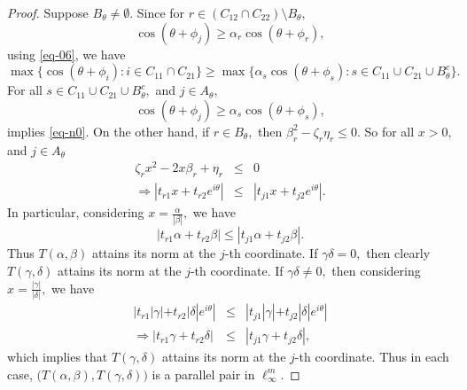 \documentclass{amsart}
\theoremstyle{definition}
\theoremstyle{remark}
\numberwithin{equation}{section}
\begin{document}
\begin{proof}
	 Suppose $B_\theta\neq \emptyset.$ Since for  $r\in (C_{12}\cap C_{22})\setminus B_\theta,$ 
	  $$\cos(\theta+\phi_j)\geq\alpha_r\cos(\theta+\phi_r),$$ using  \eqref{eq-06}, we have
	\[\max\{\cos(\theta+\phi_i):i\in C_{11}\cap C_{21}\}\geq \max\{\alpha_s\cos(\theta+\phi_s):s\in C_{11}\cup C_{21}\cup B_\theta^c\}.\] 
	For all $s\in C_{11}\cup C_{21}\cup B_\theta^c,$ and $j\in A_\theta,$  $$	\cos(\theta+\phi_j)\geq \alpha_s\cos(\theta+\phi_s),$$ implies \eqref{eq-n0}.
	On the other hand, if $r\in B_{\theta},$ then $\beta_{r}^2-\zeta_r\eta_r\leq0.$ So for all $x>0,$ and $j\in A_\theta$
	\begin{eqnarray*}
		\zeta_rx^2-2x\beta_{r}+\eta_r&\leq &0\\
		\Rightarrow |t_{r1}x+t_{r2}e^{i\theta}|&\leq&|t_{j1}x+t_{j2}e^{i\theta}|.
	\end{eqnarray*}
	In particular, considering $x=\frac{\alpha}{|\beta|},$ we have 
	\[ |t_{r1}\alpha+t_{r2}\beta|\leq|t_{j1}\alpha+t_{j2}\beta|.\]
	Thus $T(\alpha,\beta)$ attains its norm at the $j$-th coordinate. If $\gamma\delta=0,$ then clearly $T(\gamma,\delta)$ attains its norm at the $j$-th coordinate. If $\gamma\delta\neq 0,$ then considering $x=\frac{|\gamma|}{|\delta|},$ we have  
	\begin{eqnarray*}
		|t_{r1}|\gamma|+t_{r2}|\delta|e^{i\theta}|&\leq&|t_{j1}|\gamma|+t_{j2}|\delta|e^{i\theta}|\\
		\Rightarrow |t_{r1}\gamma+t_{r2}\delta|&\leq&|t_{j1}\gamma+t_{j2}\delta|,
	\end{eqnarray*}
	which implies that $T(\gamma,\delta)$ attains its norm at the $j$-th coordinate. 
	Thus in each case, $\Big(T(\alpha,\beta),T(\gamma,\delta)\Big)$ is a parallel pair in $\ell_\infty^m.$ 
\end{proof}
\end{document}
